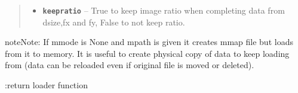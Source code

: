 \documentclass[letterpaper,10pt,english]{sphinxmanual}
\begin{document}
\begin{fulllineitems}
\begin{quote}
\begin{description}
\begin{itemize}
\item {} 
\textbf{\texttt{keepratio}} -- True to keep image ratio when completing data from dsize,fx and fy,
False to not keep ratio.

\end{itemize}

\end{description}\end{quote}

\begin{notice}{note}{Note:}
If mmode is None and mpath is given it creates mmap file but loads from it to memory.
It is useful to create physical copy of data to keep loading from (data can be reloaded
even if original file is moved or deleted).
\end{notice}

:return loader function

\end{fulllineitems}

\end{document}
